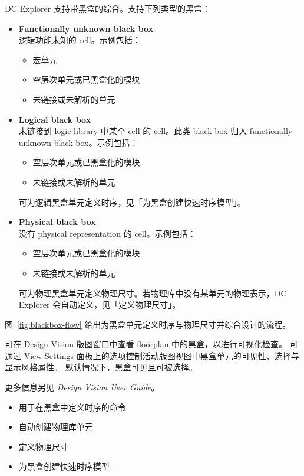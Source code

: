 DC Explorer 支持带黑盒的综合。支持下列类型的黑盒：
\begin{itemize}
  \item \textbf{Functionally unknown black box}\\
        逻辑功能未知的 cell。示例包括：
        \begin{itemize}
          \item 宏单元
          \item 空层次单元或已黑盒化的模块
          \item 未链接或未解析的单元
        \end{itemize}

  \item \textbf{Logical black box}\\
        未链接到 logic library 中某个 cell 的 cell。此类 black box 归入 functionally unknown black box。示例包括：
        \begin{itemize}
          \item 空层次单元或已黑盒化的模块
          \item 未链接或未解析的单元
        \end{itemize}
        可为逻辑黑盒单元定义时序，见「为黑盒创建快速时序模型」。

  \item \textbf{Physical black box}\\
        没有 physical representation 的 cell。示例包括：
        \begin{itemize}
          \item 空层次单元或已黑盒化的模块
          \item 未链接或未解析的单元
        \end{itemize}
        可为物理黑盒单元定义物理尺寸。若物理库中没有某单元的物理表示，DC Explorer 会自动定义，见「定义物理尺寸」。
\end{itemize}

图~\ref{fig:blackbox-flow} 给出为黑盒单元定义时序与物理尺寸并综合设计的流程。


可在 Design Vision 版图窗口中查看 floorplan 中的黑盒，以进行可视化检查。
可通过 View Settings 面板上的选项控制活动版图视图中黑盒单元的可见性、选择与显示风格属性。
默认情况下，黑盒可见且可被选择。

更多信息另见 \textit{Design Vision User Guide}。

\begin{seeAlsoBox}
\begin{itemize}
  \item 用于在黑盒中定义时序的命令
  \item 自动创建物理库单元
  \item 定义物理尺寸
  \item 为黑盒创建快速时序模型
\end{itemize}
\end{seeAlsoBox}


